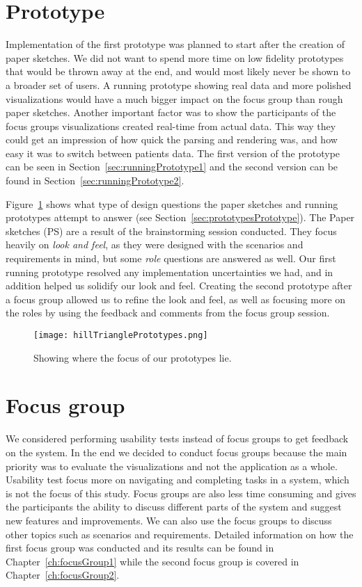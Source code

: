 \section{Prototype}
Implementation of the first prototype was planned to start after the creation of paper sketches. We did not want to spend more time on low fidelity prototypes that would be thrown away at the end, and would most likely never be shown to a broader set of users. A running prototype showing real data and more polished visualizations would have a much bigger impact on the focus group than rough paper sketches. Another important factor was to show the participants of the focus groups visualizations created real-time from actual data. This way they could get an impression of how quick the parsing and rendering was, and how easy it was to switch between patients data. The first version of the prototype can be seen in Section~\ref{sec:runningPrototype1} and the second version can be found in Section~\ref{sec:runningPrototype2}.

Figure~\ref{fig:hillTrianglePrototypex} shows what type of design questions the paper sketches and running prototypes attempt to answer (see Section~\ref{sec:prototypesPrototype}). The Paper sketches (PS) are a result of the brainstorming session conducted. They focus heavily on \textit{look and feel}, as they were designed with the scenarios and requirements in mind, but some \textit{role} questions are answered as well. Our first running prototype resolved any implementation uncertainties we had, and in addition helped us solidify our look and feel. Creating the second prototype after a focus group allowed us to refine the look and feel, as well as focusing more on the roles by using the feedback and comments from the focus group session.

\begin{figure}[h!]
	\centering
		\texttt{[image: hillTrianglePrototypes.png]}
		\caption[Prototype focus]{\footnotesize Showing where the focus of our prototypes lie.}
		\label{fig:hillTrianglePrototypex}
\end{figure}

\section{Focus group}
We considered performing usability tests instead of focus groups to get feedback on the system. In the end we decided to conduct focus groups because the main priority was to evaluate the visualizations and not the application as a whole. Usability test focus more on navigating and completing tasks in a system, which is not the focus of this study. Focus groups are also less time consuming and gives the participants the ability to discuss different parts of the system and suggest new features and improvements. We can also use the focus groups to discuss other topics such as scenarios and requirements. Detailed information on how the first focus group was conducted and its results can be found in Chapter~\ref{ch:focusGroup1} while the second focus group is covered in Chapter~\ref{ch:focusGroup2}.

